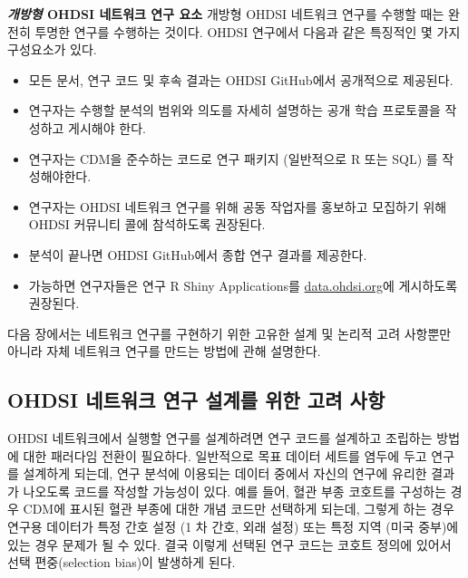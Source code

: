 \documentclass[11pt]{book}
\providecommand{\tightlist}{%
  \setlength{\itemsep}{0pt}\setlength{\parskip}{0pt}}
\theoremstyle{definition}
\theoremstyle{definition}
\theoremstyle{definition}
\theoremstyle{remark}
\begin{document}
\textbf{\emph{개방형} OHDSI 네트워크 연구 요소} 개방형 OHDSI 네트워크
연구를 수행할 때는 완전히 투명한 연구를 수행하는 것이다. OHDSI 연구에서
다음과 같은 특징적인 몇 가지 구성요소가 있다.

\begin{itemize}
\tightlist
\item
  모든 문서, 연구 코드 및 후속 결과는 OHDSI GitHub에서 공개적으로
  제공된다.
\item
  연구자는 수행할 분석의 범위와 의도를 자세히 설명하는 공개 학습
  프로토콜을 작성하고 게시해야 한다.
\item
  연구자는 CDM을 준수하는 코드로 연구 패키지 (일반적으로 R 또는 SQL) 를
  작성해야한다.
\item
  연구자는 OHDSI 네트워크 연구를 위해 공동 작업자를 홍보하고 모집하기
  위해 OHDSI 커뮤니티 콜에 참석하도록 권장된다.
\item
  분석이 끝나면 OHDSI GitHub에서 종합 연구 결과를 제공한다.
\item
  가능하면 연구자들은 연구 R Shiny Applications를
  \href{http://data.ohdsi.org}{data.ohdsi.org}에 게시하도록 권장된다.
\end{itemize}

다음 장에서는 네트워크 연구를 구현하기 위한 고유한 설계 및 논리적 고려
사항뿐만 아니라 자체 네트워크 연구를 만드는 방법에 관해 설명한다.

\subsection{OHDSI 네트워크 연구 설계를 위한 고려
사항}\label{ohdsi------}


OHDSI 네트워크에서 실행할 연구를 설계하려면 연구 코드를 설계하고
조립하는 방법에 대한 패러다임 전환이 필요하다. 일반적으로 목표 데이터
세트를 염두에 두고 연구를 설계하게 되는데, 연구 분석에 이용되는 데이터
중에서 자신의 연구에 유리한 결과가 나오도록 코드를 작성할 가능성이 있다.
예를 들어, 혈관 부종 코호트를 구성하는 경우 CDM에 표시된 혈관 부종에
대한 개념 코드만 선택하게 되는데, 그렇게 하는 경우 연구용 데이터가 특정
간호 설정 (1 차 간호, 외래 설정) 또는 특정 지역 (미국 중부)에 있는 경우
문제가 될 수 있다. 결국 이렇게 선택된 연구 코드는 코호트 정의에 있어서
선택 편중(selection bias)이 발생하게 된다.
\end{document}
